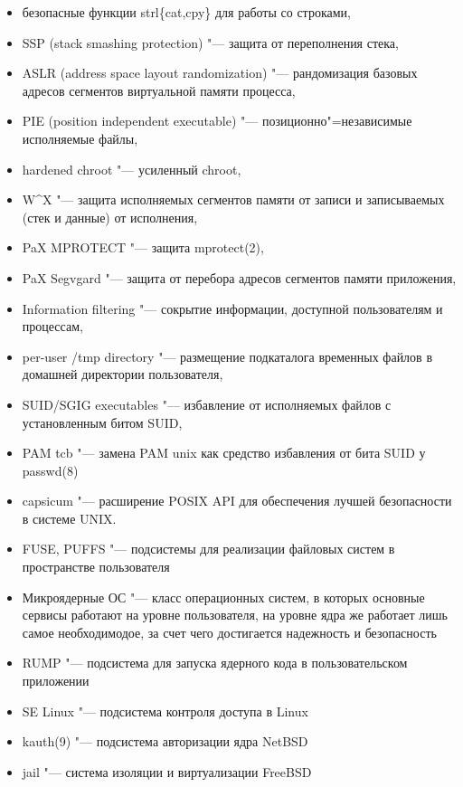 \documentclass[10pt, a5paper]{article}
\begin{document}
\begin{itemize}
  \item безопасные функции strl\{cat,cpy\} для работы со строками,
  \item SSP (stack smashing protection) "--- защита от переполнения стека,
  \item ASLR (address space layout randomization) "--- рандомизация базовых адресов сегментов виртуальной памяти процесса,
  \item PIE (position independent executable) "--- позиционно"=независимые исполняемые файлы,
  \item hardened chroot "--- усиленный chroot,
  \item W\^{}X "--- защита исполняемых сегментов памяти от записи и записываемых (стек и данные) от исполнения,
  \item PaX MPROTECT "--- защита mprotect(2),
  \item PaX Segvgard "--- защита от перебора адресов сегментов памяти приложения,
  \item Information filtering "--- сокрытие информации, доступной пользователям и процессам,
  \item per-user /tmp directory "--- размещение подкаталога временных файлов в домашней директории пользователя,
  \item SUID/SGIG executables "--- избавление от исполняемых файлов с установленным битом SUID,
  \item PAM tcb "--- замена PAM unix как средство избавления от бита SUID у passwd(8)
  \item capsicum "--- расширение POSIX API для обеспечения лучшей безопасности в системе UNIX.
  \item FUSE, PUFFS "--- подсистемы для реализации файловых систем в пространстве пользователя
  \item Микроядерные ОС "--- класс операционных систем, в которых основные сервисы работают на уровне пользователя, на уровне ядра же работает лишь самое необходимодое, за счет чего достигается надежность и безопасность
  \item RUMP "--- подсистема для запуска ядерного кода в пользовательском приложении
  \item SE Linux "--- подсистема контроля доступа в Linux
  \item kauth(9) "--- подсистема авторизации ядра NetBSD
  \item jail "--- система изоляции и виртуализации FreeBSD
\end{itemize}
\end{document}
